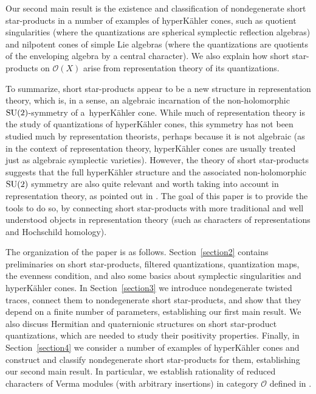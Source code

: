 \documentclass[pdftex]{sigma}
\numberwithin{equation}{section}
\begin{document}
Our second main result is the existence and classification of nondegenerate short star-products in a number of examples of hyperK\"ahler cones, such as quotient singularities (where the quantizations are spherical symplectic reflection algebras) and nilpotent cones of simple Lie algebras (where the quantizations are quotients of the enveloping algebra by a central character). We also explain how short star-products on ${\mathcal O}(X)$ arise from representation theory of its quantizations.

To summarize, short star-products appear to be a new structure in representation theory, which is, in a sense, an algebraic incarnation of the non-holomorphic ${\rm SU}(2)$-symmetry of a~hyperK\"ahler cone.
While much of representation theory is the study of quantizations of hyperK\"ahler cones, this symmetry has not been studied much by representation theorists, perhaps because it is not algebraic (as in the context of representation theory, hyperK\"ahler cones are usually treated just as algebraic symplectic varieties). However, the theory of short star-products suggests that the full hyperK\"ahler structure and the associated non-holomorphic ${\rm SU}(2)$ sym\-met\-ry are also quite relevant and worth taking into account in representation theory, as pointed out in \cite[footnote on p.~3]{BPR}. The goal of this paper is to provide the tools to do so, by connecting short star-products with more traditional and well understood objects in representation theory (such as characters of representations and Hochschild homology).

The organization of the paper is as follows. Section~\ref{section2} contains preliminaries on short star-products, filtered quantizations, quantization maps, the evenness condition, and also some basics about symplectic singularities and hyperK\"ahler cones. In Section~\ref{section3} we introduce nondegenerate twisted traces, connect them to nondegenerate short star-products, and show that they depend on a finite number of parameters, establishing our first main result. We also discuss Hermitian and quaternionic structures on short star-product quantizations, which are needed to study their positivity properties. Finally, in Section~\ref{section4} we consider a number of examples of hyperK\"ahler cones and construct and classify nondegenerate short star-products for them, establishing our second main result. In particular, we establish rationality of reduced characters of Verma modules (with arbitrary insertions) in category $\mathcal{O}$ defined in \cite{BLPW,L4}.
\end{document}
